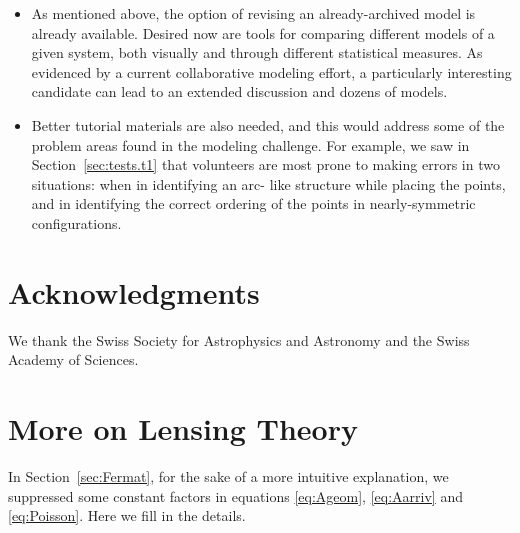 \documentclass[12pt,preprint]{aastex}
\newcommand{\secref}[1]{Section~\ref{sec:#1}}
\begin{document}
\begin{itemize}
\item As mentioned above, the option of revising an already-archived
  model is already available.  Desired now are tools for comparing
  different models of a given system, both visually and through
  different statistical measures.  As evidenced by a current
  collaborative modeling effort, a particularly interesting candidate
  can lead to an extended discussion and dozens of models.
\item Better tutorial materials are also needed, and this would
  address some of the problem areas found in the modeling challenge.
  For example, we saw in \secref{tests.t1} that volunteers are most
  prone to making errors in two situations: when in identifying an arc-
  like structure while placing the points, and in identifying the
  correct ordering of the points in nearly-symmetric configurations.
\end{itemize}

\section{Acknowledgments}

We thank the Swiss Society for Astrophysics and Astronomy and the
Swiss Academy of Sciences.

\clearpage

\appendix

\section{More on Lensing Theory} \label{sec:more-theory}

In \secref{Fermat}, for the sake of a more intuitive
explanation, we suppressed some constant factors in
equations \eqref{eq:Ageom}, \eqref{eq:Aarriv} and \eqref{eq:Poisson}.
Here we fill in the details.
\end{document}
